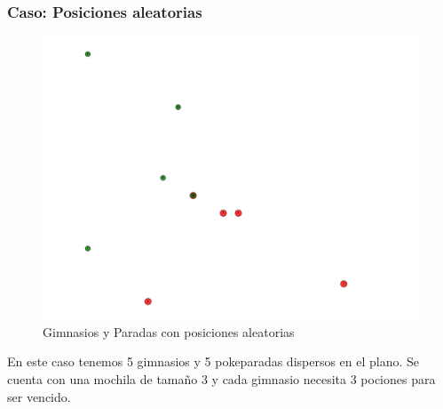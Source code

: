 \subsubsection{Caso: Posiciones aleatorias}

\begin{figure}[H]
  \begin{center}
    \includegraphics[scale=0.4]{imagenes/test4.pdf}
    \caption{Gimnasios y Paradas con posiciones aleatorias}
    \label{fig:ej2_caso4}
  \end{center}
\end{figure}

En este caso tenemos 5 gimnasios y 5 pokeparadas dispersos en el plano. Se cuenta con una mochila de tamaño 3 y cada gimnasio necesita 3 pociones para ser vencido.

